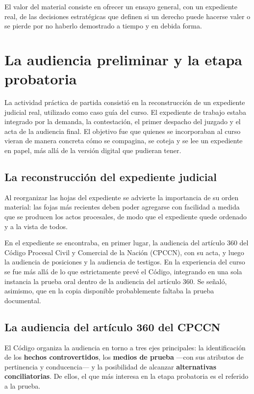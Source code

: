 \documentclass[12pt,oneside]{book}
\begin{document}
El valor del material consiste en ofrecer un ensayo general, con un expediente real, de las decisiones estratégicas que definen si un derecho puede hacerse valer o se pierde por no haberlo demostrado a tiempo y en debida forma.

\chapter[Audiencia preliminar y etapa probatoria]{La audiencia preliminar y la etapa probatoria}

La actividad práctica de partida consistió en la reconstrucción de un expediente judicial real, utilizado como caso guía del curso. El expediente de trabajo estaba integrado por la demanda, la contestación, el primer despacho del juzgado y el acta de la audiencia final. El objetivo fue que quienes se incorporaban al curso vieran de manera concreta cómo se compagina, se coteja y se lee un expediente en papel, más allá de la versión digital que pudieran tener.

\section{La reconstrucción del expediente judicial}

Al reorganizar las hojas del expediente se advierte la importancia de su orden material: las fojas más recientes deben poder agregarse con facilidad a medida que se producen los actos procesales, de modo que el expediente quede ordenado y a la vista de todos.

En el expediente se encontraba, en primer lugar, la audiencia del artículo 360 del Código Procesal Civil y Comercial de la Nación (CPCCN), con su acta, y luego la audiencia de posiciones y la audiencia de testigos. En la experiencia del curso se fue más allá de lo que estrictamente prevé el Código, integrando en una sola instancia la prueba oral dentro de la audiencia del artículo 360. Se señaló, asimismo, que en la copia disponible probablemente faltaba la prueba documental.

\section{La audiencia del artículo 360 del CPCCN}

El Código organiza la audiencia en torno a tres ejes principales: la identificación de los \textbf{hechos controvertidos}, los \textbf{medios de prueba} ---con sus atributos de pertinencia y conducencia--- y la posibilidad de alcanzar \textbf{alternativas conciliatorias}. De ellos, el que más interesa en la etapa probatoria es el referido a la prueba.
\end{document}
